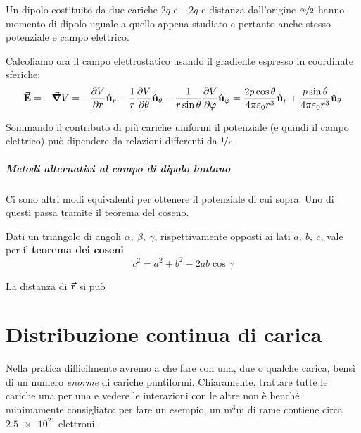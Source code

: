 \begin{example}
	Un dipolo costituito da due cariche $2q$ e $-2q$ e distanza dall'origine $\nicefrac{z_0}{2}$ hanno momento di dipolo uguale a quello appena studiato e pertanto anche stesso potenziale e campo elettrico.
\end{example}
Calcoliamo ora il campo elettrostatico usando il gradiente espresso in coordinate sferiche:
\begin{equation}
	\vb*{\va{E}}=-\grad{V}=-\pdv{V}{r}\hat{\mathbf{u}}_r-\frac{1}{r}\pdv{V}{\theta}\hat{\mathbf{u}}_\theta-\frac{1}{r\sin\theta}\pdv{V}{\varphi}\hat{\mathbf{u}}_\varphi=\frac{2p\cos\theta}{4\pi\varepsilon_0r^3}\hat{\mathbf{u}}_r+\frac{p\sin\theta}{4\pi\varepsilon_0r^3}\hat{\mathbf{u}}_\theta
\end{equation}
\begin{observe}
	Sommando il contributo di più cariche uniformi il potenziale (e quindi il campo elettrico) può dipendere da relazioni differenti da $\nicefrac{1}{r}$.
\end{observe}
\subparagraph{Metodi alternativi al campo di dipolo lontano}
	Ci sono altri modi equivalenti per ottenere il potenziale di cui sopra. Uno di questi passa tramite il teorema del coseno. 
	\begin{remember}
		Dati un triangolo di angoli $\alpha,\ \beta,\ \gamma$, rispettivamente opposti ai lati $a,\ b,\ c$, vale per il \textbf{teorema dei coseni}
		\begin{equation}
			c^2=a^2+b^2-2ab\cos \gamma
		\end{equation}
	\end{remember}
	La distanza di $\vb*{\va{r}}$ si può
\section{Distribuzione continua di carica}
Nella pratica difficilmente avremo a che fare con una, due o qualche carica, bensì di un numero \textit{enorme} di cariche puntiformi. Chiaramente, trattare tutte le cariche una per una e vedere le interazioni con le altre non è benché minimamente consigliato: per fare un esempio, un $\unit{\cubic\milli\metre}$ di rame contiene circa $\num[exponent-product = \ensuremath{\cdot}]{2,5e21}$ elettroni.

